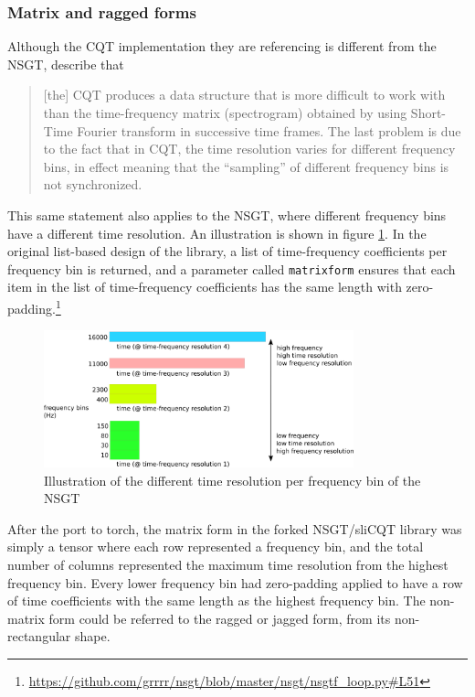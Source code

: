 \documentclass[report.tex]{subfiles}
\begin{document}
\subsubsection{Matrix and ragged forms}
\label{sec:matrixvragged}

Although the CQT implementation they are referencing is different from the NSGT, \textcite{klapuricqt} describe that
\begin{quote}
	[the] CQT produces a data structure that is more difficult to work with than the time-frequency matrix (spectrogram) obtained by using Short-Time Fourier transform in successive time frames. The last problem is due to the fact that in CQT, the time resolution varies for different frequency bins, in effect meaning that the ``sampling'' of different frequency bins is not synchronized.
\end{quote}

This same statement also applies to the NSGT, where different frequency bins have a different time resolution. An illustration is shown in figure \ref{fig:raggedslicqt}. In the original list-based design of the library, a list of time-frequency coefficients per frequency bin is returned, and a parameter called \Verb#matrixform# ensures that each item in the list of time-frequency coefficients has the same length with zero-padding.\footnote{\url{https://github.com/grrrr/nsgt/blob/master/nsgt/nsgtf_loop.py\#L51}}

\begin{figure}[ht]
	\centering
	\includegraphics[width=0.8\textwidth]{./images-misc/slicq_shape.png}
	\caption{Illustration of the different time resolution per frequency bin of the NSGT}
	\label{fig:raggedslicqt}
\end{figure}

After the port to torch, the matrix form in the forked NSGT/sliCQT library was simply a tensor where each row represented a frequency bin, and the total number of columns represented the maximum time resolution from the highest frequency bin. Every lower frequency bin had zero-padding applied to have a row of time coefficients with the same length as the highest frequency bin. The non-matrix form could be referred to the ragged or jagged form, from its non-rectangular shape.
\end{document}
